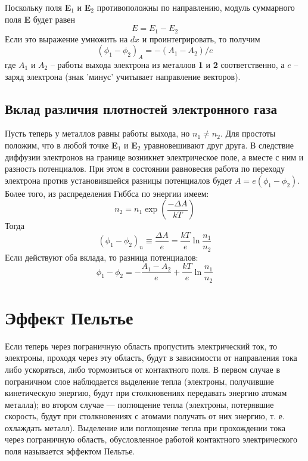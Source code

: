 \documentclass[a4paper, 12pt, openany]{book}
\begin{document}
	Поскольку поля \textbf{E$_1$} и \textbf{E$_2$} противоположны по направлению, модуль суммарного поля \textbf{E} будет равен
	$$E = E_1 - E_2$$ Если это выражение умножить на $dx$ и проинтегрировать, то получим \begin{equation}
	(\phi_1 - \phi_2)_A = -(A_1 - A_2)/e
	\label{eq1}
	\end{equation}
	где $A_1$ и $A_2$ -- работы выхода электрона из металлов \textbf{1} и \textbf{2} соответственно, а $e$ -- заряд электрона (знак 'минус' учитывает направление векторов).
	
	\subsection{Вклад различия плотностей электронного газа}
	Пусть теперь у металлов равны работы выхода, но $n_1 \ne n_2$. Для простоты положим, что в любой точке \textbf{E$_1$} и \textbf{E$_2$} уравновешивают друг друга. В следствие диффузии электронов на границе возникнет электрическое поле, а вместе с ним и разность потенциалов. При этом в состоянии равновесия работа по переходу электрона против установившейся разницы потенциалов будет $A = e(\phi_1 - \phi_2)$. Более того, из распределения Гиббса по энергии имеем:
	$$ n_2 = n_1 \exp\left(\frac{-\Delta A}{kT}\right)$$
	Тогда
	\begin{equation}
	(\phi_1 - \phi_2)_n \equiv \frac{\Delta A}{e} = \frac{kT}{e} \ln\frac{n_1}{n_2}
	\label{eq2}
	\end{equation}
	Если действуют оба вклада, то разница потенциалов:
	\begin{equation}
	\phi_1 - \phi_2 = - \frac{A_1 - A_2}{e} + \frac{kT}{e} \ln\frac{n_1}{n_2}
	\label{finEq}
	\end{equation}
	
	\section{Эффект Пельтье}
	Если теперь через пограничную область пропустить электрический ток, то электроны, проходя через эту область, будут в зависимости от направления тока либо ускоряться, либо тормозиться от контактного поля. В первом случае в пограничном слое наблюдается выделение тепла (электроны, получившие кинетическую энергию, будут при столкновениях передавать энергию атомам металла); во втором случае — поглощение тепла (электроны, потерявшие скорость, будут
	при столкновениях с атомами получать от них энергию, т. е. охлаждать металл). Выделение или поглощение тепла при прохождении тока через пограничную область, обусловленное работой контактного электрического поля называется эффектом Пельтье.
	
\end{document}
